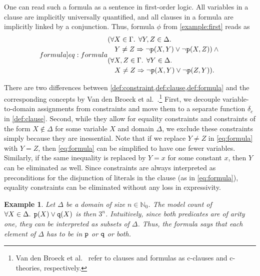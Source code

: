 \documentclass{article}
\newtheorem{example}{Example}
\newcommand{\predicate}{\texttt{\textup{p}}}
\newcommand{\predicateq}{\texttt{\textup{q}}}
\begin{document}
One can read such a formula as a sentence in first-order logic. All variables in
a clause are implicitly universally quantified, and all clauses in a formula are
implicitly linked by a conjunction. Thus, formula $\phi$ from
\cref{example:first} reads as
\begin{equation}\label[formula]{eq:formula}
  \begin{split}
    &\begin{multlined}[t]
      (\forall X \in \Gamma\text{. }\forall Y, Z \in \Delta\text{. }\\
      Y \ne Z \Rightarrow \neg \predicate(X, Y) \lor \neg \predicate(X, Z)) \land{}
    \end{multlined}\\
    &\begin{multlined}[t]
      (\forall X, Z \in \Gamma\text{. }\forall Y \in \Delta\text{. }\\
      X \ne Z \Rightarrow \neg \predicate(X, Y) \lor \neg \predicate(Z, Y)).
    \end{multlined}
  \end{split}
\end{equation}

There are two differences between \cref{def:constraint,def:clause,def:formula}
and the corresponding concepts by Van den Broeck et
al.~.\footnote{Van den Broeck et
  al.~ refer to clauses and formulas as
  c-clauses and c-theories, respectively.} First, we decouple variable-to-domain
assignments from constraints and move them to a separate function $\delta_{c}$
in \cref{def:clause}. Second, while they allow for equality constraints and
constraints of the form $X \not\in \Delta$ for some variable $X$ and domain
$\Delta$, we exclude these constraints simply because they are inessential. Note
that if we replace $Y \ne Z$ in \cref{eq:formula} with $Y = Z$, then
\cref{eq:formula} can be simplified to have one fewer variables. Similarly, if
the same inequality is replaced by $Y = x$ for some constant $x$, then $Y$ can
be eliminated as well. Since constraints are always interpreted as preconditions
for the disjunction of literals in the clause (as in \cref{eq:formula}),
equality constraints can be eliminated without any loss in expressivity.

\begin{example}\label{example:simple}
  Let $\Delta$ be a domain of size $n \in \mathbb{N}_{0}$. The model count of
  $\forall X \in \Delta\text{. } \predicate(X) \lor \predicateq(X)$ is then
  $3^{n}$. Intuitively, since both predicates are of arity one, they can be
  interpreted as subsets of $\Delta$. Thus, the formula says that each element
  of $\Delta$ has to be in $\predicate$ or $\predicateq$ or both.
\end{example}
\end{document}
